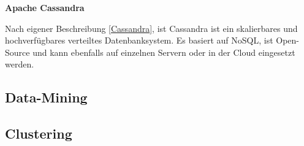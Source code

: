 \textbf{Apache Cassandra}\vspace{0.2cm}

Nach eigener Beschreibung [\href{https://cassandra.apache.org}{Cassandra}], ist Cassandra ist ein skalierbares und hochverfügbares verteiltes Datenbanksystem. Es basiert auf NoSQL, ist Open-Source und kann ebenfalls auf einzelnen Servern oder in der Cloud eingesetzt werden.

\subsection{Data-Mining}

\subsection{Clustering}
